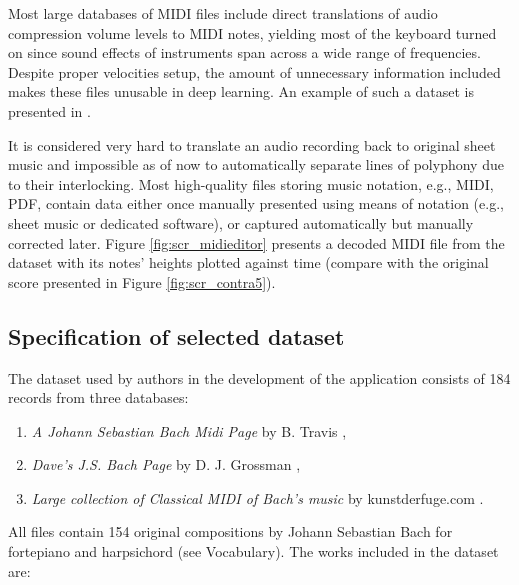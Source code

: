 \documentclass[a4paper, 11pt, twoside]{report}
\theoremstyle{definition}
\begin{document}
Most large databases of MIDI files include direct translations of audio compression volume levels to MIDI notes, yielding most of the keyboard turned on since sound effects of instruments span across a wide range of frequencies. Despite proper velocities setup, the amount of unnecessary information included makes these files unusable in deep learning. An example of such a dataset is presented in \cite{MIDI_dirty}. \par
It is considered very hard to translate an audio recording back to original sheet music and impossible as of now to automatically separate lines of polyphony due to their interlocking. Most high-quality files storing music notation, e.g., MIDI, PDF, contain data either once manually presented using means of notation (e.g., sheet music or dedicated software), or captured automatically but manually corrected later. Figure \ref{fig:scr_midieditor} presents a decoded MIDI file from the dataset with its notes' heights plotted against time (compare with the original score presented in Figure \ref{fig:scr_contra5}). \par

\subsection{Specification of selected dataset} \label{sec:data_spec}

The dataset used by authors in the development of the application consists of 184 records from three databases:

\begin{enumerate}
    \item \textit{A Johann Sebastian Bach Midi Page} by B. Travis \cite{MIDI_central},
    \item \textit{Dave's J.S. Bach Page} by D. J. Grossman \cite{MIDI_Dave},
    \item \textit{Large collection of Classical MIDI of Bach's music} by kunstderfuge.com \cite{MIDI_kunst}.
\end{enumerate} \par

All files contain 154 original compositions by Johann Sebastian Bach for fortepiano and harpsichord (see Vocabulary). The works included in the dataset are:
\end{document}
